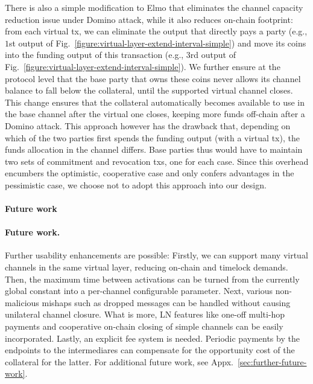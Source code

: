 There is also a simple modification to Elmo that eliminates the channel capacity reduction issue under Domino attack, while it also reduces on-chain
footprint: from each virtual tx, we can
eliminate the output that directly
pays a party (e.g., $1$st output of
Fig.~\ref{figure:virtual-layer-extend-interval-simple}) and move its coins into
the funding output of this transaction (e.g., $3$rd
output of Fig.~\ref{figure:virtual-layer-extend-interval-simple}). We further
ensure at the protocol level that the base party that owns these coins never
allows its channel balance to fall below the collateral, until the supported
virtual channel closes. This change ensures that the collateral
automatically becomes available to use in the base channel after the virtual one
closes, keeping more funds off-chain after a Domino attack. This approach
however has the drawback that, depending on which of the two parties first
spends the funding output (with a virtual tx), the funds allocation in the
channel differs. Base parties thus would have to maintain two sets of commitment
and revocation txs, one for each case. Since this overhead encumbers the
optimistic, cooperative case and only confers advantages in the pessimistic
case, we choose not to adopt this approach into our design.

\makeatletter%
%
  {\paragraph{Future work}}%
  {\paragraph{Future work.}}%
\makeatother%
  Further usability enhancements are possible: Firstly, we can
  support many virtual channels in the same virtual layer, reducing on-chain
  and timelock demands. Then, the maximum time between
  activations can be turned from the currently global constant into a
  per-channel configurable parameter. Next, various non-malicious mishaps
  such as dropped messages can be handled without causing unilateral
  channel closure. What is more, LN features like one-off multi-hop payments and
  cooperative on-chain closing of simple channels can be easily
  incorporated.
  Lastly, an explicit fee system is needed. Periodic payments by the
  endpoints to the
  intermediares can compensate for the opportunity cost of the collateral for
  the latter.
  For additional future work, see Appx.~\ref{sec:further-future-work}.

